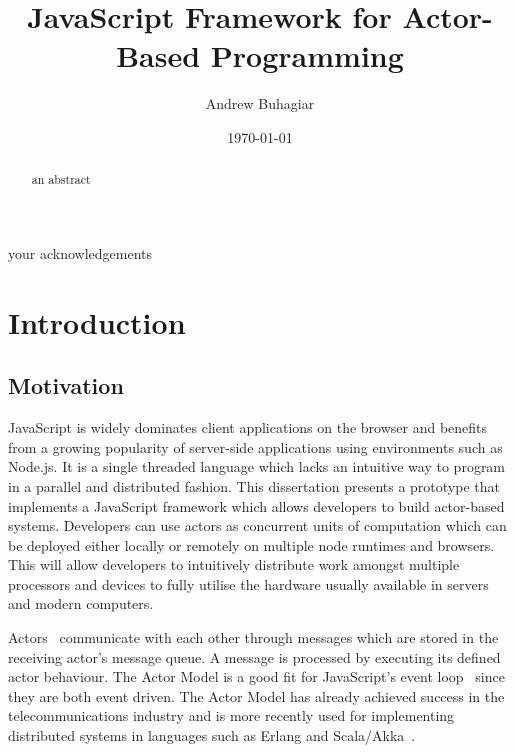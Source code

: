\documentclass[12pt, a4paper]{report}
\theoremstyle{definition}
\theoremstyle{definition}%
\theoremstyle{definition}%
\theoremstyle{definition}%
\theoremstyle{definition}%
\theoremstyle{definition}%
\begin{document}
\title{JavaScript Framework for Actor-Based Programming}
\author{Andrew Buhagiar}
\date{\today}

\frontmatter


\begin{acknowledgements}
your acknowledgements
\end{acknowledgements}
       
\begin{abstract}
an abstract
\end{abstract}

\tableofcontents

\listoffigures

\listoftables



\mainmatter

\chapter{Introduction}
\section{Motivation}
JavaScript is widely dominates client applications on the browser and benefits from a growing popularity of server-side applications using environments such as Node.js. It is a single threaded language which lacks an intuitive way to program in a parallel and distributed fashion. This dissertation presents a prototype that implements a JavaScript framework which allows developers to build actor-based systems. Developers can use actors as concurrent units of computation which can be deployed either locally or remotely on multiple node runtimes and browsers. This will allow developers to intuitively distribute work amongst multiple processors and devices to fully utilise the hardware usually available in servers and modern computers.

Actors~\cite{hewitt1973session}\cite{43years} communicate with each other through messages which are stored in the receiving actor's message queue. A message is processed by executing its defined actor behaviour. The Actor Model is a good fit for JavaScript's event loop~\cite{eventloopbrowser}\cite{eventloopnode} since they are both event driven. The Actor Model has already achieved success in the telecommunications industry and is more recently used for implementing distributed systems in languages such as Erlang and Scala/Akka~\cite{haller2012integration}.
\end{document}
